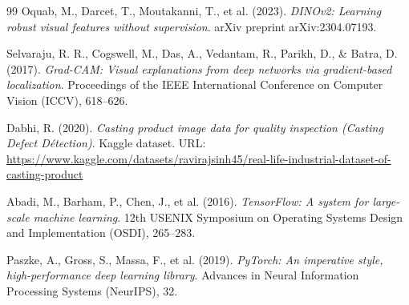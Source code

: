 \documentclass[12pt,a4paper,openany]{report}
\begin{document}
\begin{thebibliography}{99}
Oquab, M., Darcet, T., Moutakanni, T., et al. (2023).
\textit{DINOv2: Learning robust visual features without supervision}.
arXiv preprint arXiv:2304.07193.

Selvaraju, R. R., Cogswell, M., Das, A., Vedantam, R., Parikh, D., \& Batra, D. (2017).
\textit{Grad-CAM: Visual explanations from deep networks via gradient-based localization}.
Proceedings of the IEEE International Conference on Computer Vision (ICCV), 618--626.

Dabhi, R. (2020).
\textit{Casting product image data for quality inspection (Casting Defect Détection)}.
Kaggle dataset. URL: \url{https://www.kaggle.com/datasets/ravirajsinh45/real-life-industrial-dataset-of-casting-product}

Abadi, M., Barham, P., Chen, J., et al. (2016).
\textit{TensorFlow: A system for large-scale machine learning}.
12th USENIX Symposium on Operating Systems Design and Implementation (OSDI), 265--283.

Paszke, A., Gross, S., Massa, F., et al. (2019).
\textit{PyTorch: An imperative style, high-performance deep learning library}.
Advances in Neural Information Processing Systems (NeurIPS), 32.

\end{thebibliography}
\end{document}
